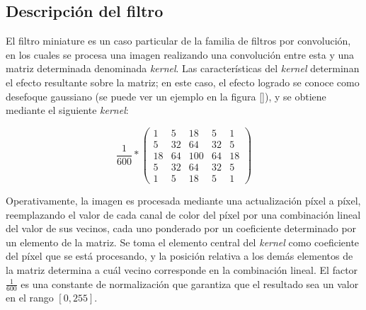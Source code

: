 \subsection{Descripción del filtro}
\label{sub:miniature_descripcion}

El filtro miniature es un caso particular de la familia de filtros por convolución, en los cuales se procesa una imagen realizando una convolución entre esta y una matriz determinada denominada \emph{kernel}. Las características del \emph{kernel} determinan el efecto resultante sobre la matriz; en este caso, el efecto logrado se conoce como desefoque gaussiano (se puede ver un ejemplo en la figura \ref{}), y se obtiene mediante el siguiente \emph{kernel}:

\[ \frac{1}{600} *  \left( \begin{array}{ccccc}
  1 &   5 &  18 &   5 &   1 \\
  5 &  32 &  64 &  32 &   5 \\
 18 &  64 & 100 &  64 &  18 \\
  5 &  32 &  64 &  32 &   5 \\
  1 &   5 &  18 &   5 &   1 \end{array} \right)\]

Operativamente, la imagen es procesada mediante una actualización píxel a píxel, reemplazando el valor de cada canal de color del píxel por una combinación lineal del valor de sus vecinos, cada uno ponderado por un coeficiente determinado por un elemento de la matriz. Se toma el elemento central del \emph{kernel} como coeficiente del píxel que se está procesando, y la posición relativa a los demás elementos de la matriz determina a cuál vecino corresponde en la combinación lineal. El factor $\frac{1}{600}$ es una constante de normalización que garantiza que el resultado sea un valor en el rango $[0, 255]$.

